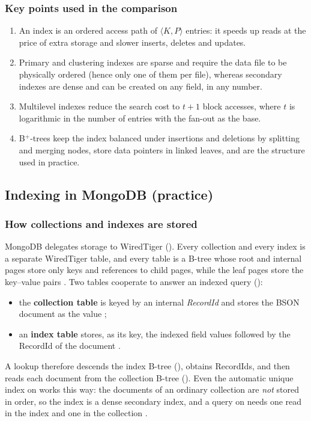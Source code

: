 \subsubsection{Key points used in the comparison}
\begin{enumerate}
  \item An index is an ordered access path of $\langle K, P\rangle$ entries: it speeds up reads at
        the price of extra storage and slower inserts, deletes and updates.
  \item Primary and clustering indexes are sparse and require the data file to be physically
        ordered (hence only one of them per file), whereas secondary indexes are dense and can be
        created on any field, in any number.
  \item Multilevel indexes reduce the search cost to $t+1$ block accesses, where $t$ is logarithmic
        in the number of entries with the fan-out as the base.
  \item B$^+$-trees keep the index balanced under insertions and deletions by splitting and merging
        nodes, store data pointers in linked leaves, and are the structure used in practice.
\end{enumerate}

\subsection{Indexing in MongoDB (practice)}
\label{sec:index-practice}

\subsubsection{How collections and indexes are stored}
\label{sec:index-storage}
MongoDB delegates storage to WiredTiger (). Every collection and every index
is a separate WiredTiger table, and every table is a B-tree whose root and internal pages store only
keys and references to child pages, while the leaf pages store the key--value pairs
\cite{wt-btree}. Two tables cooperate to answer an indexed query ():
\begin{itemize}
  \item the \textbf{collection table} is keyed by an internal \emph{RecordId} and stores the BSON
        document as the value \cite{pachot-recordid};
  \item an \textbf{index table} stores, as its key, the indexed field values followed by the
        RecordId of the document \cite{mongodb-dev-keystring}.
\end{itemize}
A lookup therefore descends the index B-tree (), obtains RecordIds, and then reads each
document from the collection B-tree (). Even the automatic unique index on 
works this way: the documents of an ordinary collection are \emph{not} stored in  order,
so the  index is a dense secondary index, and a query on  needs one read in the
index and one in the collection \cite{mongodb-clustered}.

